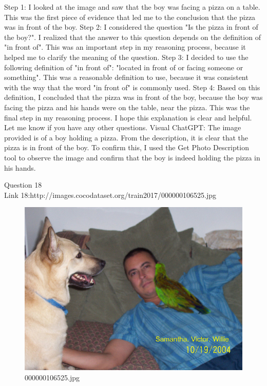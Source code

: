 \begin{enumerate}
        Step 1: I looked at the image and saw that the boy was facing a pizza on a table. This was the first piece of evidence that led me to the conclusion that the pizza was in front of the boy.
        Step 2: I considered the question "Is the pizza in front of the boy?". I realized that the answer to this question depends on the definition of "in front of". This was an important step in my reasoning process, because it helped me to clarify the meaning of the question.
        Step 3: I decided to use the following definition of "in front of": "located in front of or facing someone or something". This was a reasonable definition to use, because it was consistent with the way that the word "in front of" is commonly used.
        Step 4: Based on this definition, I concluded that the pizza was in front of the boy, because the boy was facing the pizza and his hands were on the table, near the pizza. This was the final step in my reasoning process.
        I hope this explanation is clear and helpful. Let me know if you have any other questions.
        \subitem Visual ChatGPT: The image provided is of a boy holding a pizza. From the description, it is clear that the pizza is in front of the boy. To confirm this, I used the Get Photo Description tool to observe the image and confirm that the boy is indeed holding the pizza in his hands.
    \end{enumerate}
Question 18\\
Link 18:http://images.cocodataset.org/train2017/000000106525.jpg
    \begin{figure}[h]
        \centering
        \includegraphics[width=0.8\linewidth]{../image set/easy/000000106525.jpg}
        \caption{000000106525.jpg}
    \end{figure}

